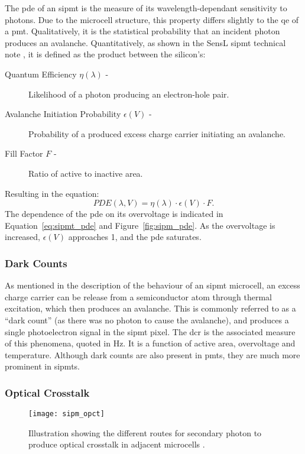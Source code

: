 The \gls{pde} of an \gls{sipmt} is the measure of its wavelength-dependant sensitivity to photons. Due to the microcell structure, this property differs slightly to the \gls{qe} of a \gls{pmt}. Qualitatively, it is the statistical probability that an incident photon produces an avalanche. Quantitatively, as shown in the SensL \gls{sipmt} technical note \cite{SensL2011}, it is defined as the product between the silicon's:
\begin{description}
\item [Quantum Efficiency $\eta(\lambda)$ -] Likelihood of a photon producing an electron-hole pair. 
\item [Avalanche Initiation Probability $\epsilon(V)$ -] Probability of a produced excess charge carrier initiating an avalanche.
\item [Fill Factor $F$ -] Ratio of active to inactive area.
\end{description}
Resulting in the equation:
\begin{equation} \label{eq:sipmt_pde}
PDE(\lambda, V) = \eta(\lambda) \cdot \epsilon(V) \cdot F.
\end{equation}
The dependence of the \gls{pde} on its overvoltage is indicated in Equation~\ref{eq:sipmt_pde} and Figure~\ref{fig:sipm_pde}. As the overvoltage is increased, $\epsilon(V)$ approaches 1, and the \gls{pde} saturates.

\subsubsection{Dark Counts}

As mentioned in the description of the behaviour of an \gls{sipmt} microcell, an excess charge carrier can be release from a semiconductor atom through thermal excitation, which then produces an avalanche. This is commonly referred to as a ``dark count'' (as there was no photon to cause the avalanche), and produces a single photoelectron signal in the \gls{sipmt} pixel. The \gls{dcr} is the associated measure of this phenomena, quoted in \si{Hz}. It is a function of active area, overvoltage and temperature. Although dark counts are also present in \glspl{pmt}, they are much more prominent in \glspl{sipmt}.

\subsubsection{Optical Crosstalk}

\begin{figure}
	\centering
    \texttt{[image: sipm\_opct]}  
	\caption[Illustration of the possible ways optical crosstalk is produced.]{Illustration showing the different routes for secondary photon to produce optical crosstalk in adjacent microcells \cite{Rech2008}.}
	\label{fig:sipm_opct}
\end{figure}

